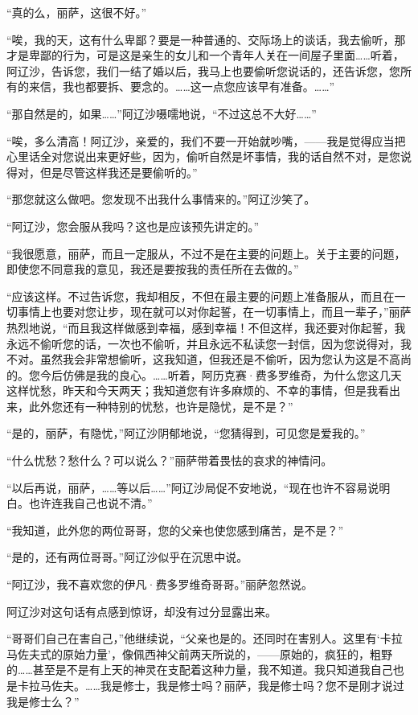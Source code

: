 \par “真的么，丽萨，这很不好。”
\par “唉，我的天，这有什么卑鄙？要是一种普通的、交际场上的谈话，我去偷听，那才是卑鄙的行为，可是这是亲生的女儿和一个青年人关在一间屋子里面……听着，阿辽沙，告诉您，我们一结了婚以后，我马上也要偷听您说话的，还告诉您，您所有的来信，我也都要拆、要念的。……这一点您应该早有准备。……”
\par “那自然是的，如果……”阿辽沙嗫嚅地说，“不过这总不大好……”
\par “唉，多么清高！阿辽沙，亲爱的，我们不要一开始就吵嘴，——我是觉得应当把心里话全对您说出来更好些，因为，偷听自然是坏事情，我的话自然不对，是您说得对，但是尽管这样我还是要偷听的。”
\par “那您就这么做吧。您发现不出我什么事情来的。”阿辽沙笑了。
\par “阿辽沙，您会服从我吗？这也是应该预先讲定的。”
\par “我很愿意，丽萨，而且一定服从，不过不是在主要的问题上。关于主要的问题，即使您不同意我的意见，我还是要按我的责任所在去做的。”
\par “应该这样。不过告诉您，我却相反，不但在最主要的问题上准备服从，而且在一切事情上也要对您让步，现在就可以对你起誓，在一切事情上，而且一辈子，”丽萨热烈地说，“而且我这样做感到幸福，感到幸福！不但这样，我还要对你起誓，我永远不偷听您的话，一次也不偷听，并且永远不私读您一封信，因为您说得对，我不对。虽然我会非常想偷听，这我知道，但我还是不偷听，因为您认为这是不高尚的。您今后仿佛是我的良心。……听着，阿历克赛·费多罗维奇，为什么您这几天这样忧愁，昨天和今天两天；我知道您有许多麻烦的、不幸的事情，但是我看出来，此外您还有一种特别的忧愁，也许是隐忧，是不是？”
\par “是的，丽萨，有隐忧，”阿辽沙阴郁地说，“您猜得到，可见您是爱我的。”
\par “什么忧愁？愁什么？可以说么？”丽萨带着畏怯的哀求的神情问。
\par “以后再说，丽萨，……等以后……”阿辽沙局促不安地说，“现在也许不容易说明白。也许连我自己也说不清。”
\par “我知道，此外您的两位哥哥，您的父亲也使您感到痛苦，是不是？”
\par “是的，还有两位哥哥。”阿辽沙似乎在沉思中说。
\par “阿辽沙，我不喜欢您的伊凡·费多罗维奇哥哥。”丽萨忽然说。
\par 阿辽沙对这句话有点感到惊讶，却没有过分显露出来。
\par “哥哥们自己在害自己，”他继续说，“父亲也是的。还同时在害别人。这里有‘卡拉马佐夫式的原始力量’，像佩西神父前两天所说的，——原始的，疯狂的，粗野的……甚至是不是有上天的神灵在支配着这种力量，我不知道。我只知道我自己也是卡拉马佐夫。……我是修士，我是修士吗？丽萨，我是修士吗？您不是刚才说过我是修士么？”
